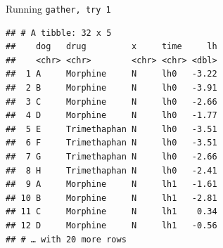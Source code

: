 \documentclass[ignorenonframetext,]{beamer}
\newenvironment{Shaded}{\begin{snugshade}}{\end{snugshade}}
\newcommand{\DataTypeTok}[1]{\textcolor[rgb]{0.13,0.29,0.53}{#1}}
\newcommand{\DecValTok}[1]{\textcolor[rgb]{0.00,0.00,0.81}{#1}}
\newcommand{\KeywordTok}[1]{\textcolor[rgb]{0.13,0.29,0.53}{\textbf{#1}}}
\newcommand{\NormalTok}[1]{#1}
\newcommand{\OperatorTok}[1]{\textcolor[rgb]{0.81,0.36,0.00}{\textbf{#1}}}
\newcommand{\StringTok}[1]{\textcolor[rgb]{0.31,0.60,0.02}{#1}}
\begin{document}
\begin{frame}[fragile]{Running \texttt{gather,\ try\ 1}}
\protect\hypertarget{running-gather-try-1}{}

\begin{Shaded}
\end{Shaded}

\begin{verbatim}
## # A tibble: 32 x 5
##    dog   drug         x     time     lh
##    <chr> <chr>        <chr> <chr> <dbl>
##  1 A     Morphine     N     lh0   -3.22
##  2 B     Morphine     N     lh0   -3.91
##  3 C     Morphine     N     lh0   -2.66
##  4 D     Morphine     N     lh0   -1.77
##  5 E     Trimethaphan N     lh0   -3.51
##  6 F     Trimethaphan N     lh0   -3.51
##  7 G     Trimethaphan N     lh0   -2.66
##  8 H     Trimethaphan N     lh0   -2.41
##  9 A     Morphine     N     lh1   -1.61
## 10 B     Morphine     N     lh1   -2.81
## 11 C     Morphine     N     lh1    0.34
## 12 D     Morphine     N     lh1   -0.56
## # … with 20 more rows
\end{verbatim}

\end{frame}
\end{document}
